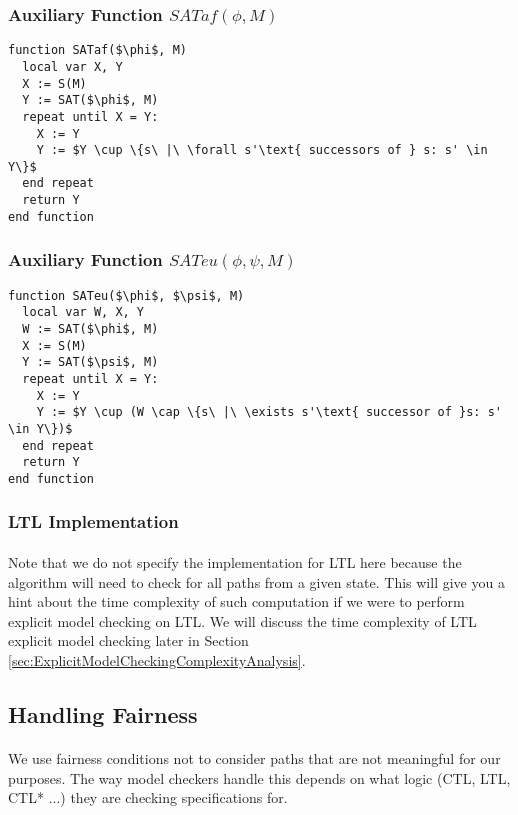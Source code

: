 \documentclass{article}
\theoremstyle{plain}
\theoremstyle{definition}
\begin{document}
\begin{multicols}{2}
\subsubsection{Auxiliary Function $SATaf(\phi, M)$}

\begin{lstlisting}[mathescape=true]
function SATaf($\phi$, M)
  local var X, Y
  X := S(M)
  Y := SAT($\phi$, M)
  repeat until X = Y:
    X := Y
    Y := $Y \cup \{s\ |\ \forall s'\text{ successors of } s: s' \in Y\}$
  end repeat
  return Y
end function
\end{lstlisting}

\subsubsection{Auxiliary Function $SATeu(\phi, \psi, M)$}

\begin{lstlisting}[mathescape=true]
function SATeu($\phi$, $\psi$, M)
  local var W, X, Y
  W := SAT($\phi$, M)
  X := S(M)
  Y := SAT($\psi$, M)
  repeat until X = Y:
    X := Y
    Y := $Y \cup (W \cap \{s\ |\ \exists s'\text{ successor of }s: s' \in Y\})$
  end repeat
  return Y
end function
\end{lstlisting}

\subsubsection{LTL Implementation}

\paragraph{} Note that we do not specify the implementation for LTL here because the algorithm will need to check for all paths from a given state. This will give you a hint about the time complexity of such computation if we were to perform explicit model checking on LTL. We will discuss the time complexity of LTL explicit model checking later in Section \ref{sec:ExplicitModelCheckingComplexityAnalysis}.

\subsection{Handling Fairness}\label{sec:HandlingFairness}
\paragraph{} We use fairness conditions not to consider paths that are not meaningful for our purposes. The way model checkers handle this depends on what logic (CTL, LTL, CTL* ...) they are checking specifications for.


\end{multicols}
\end{document}

